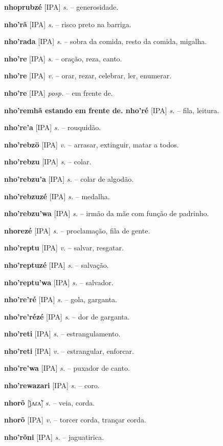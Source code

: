 \textbf{nhoprubzé} [IPA] \textit{s.} -- generosidade.

\textbf{nho'rã} [IPA] \textit{s.} -- risco preto na barriga.

\textbf{nho'rada} [IPA] \textit{s.} -- sobra da comida, resto da comida, migalha.

\textbf{nho're} [IPA] \textit{s.} -- oração, reza, canto.

\textbf{nho're} [IPA] \textit{v.} -- orar, rezar, celebrar, ler, enumerar.

\textbf{nho're} [IPA] \textit{posp.} -- em frente de.

\textbf{nho'remhã estando em frente de. nho'ré} [IPA] \textit{s.} -- fila, leitura.

\textbf{nho're'a} [IPA] \textit{s.} -- rouquidão.

\textbf{nho'rebzö} [IPA] \textit{v.} -- arrasar, extinguir, matar a todos.

\textbf{nho'rebzu} [IPA] \textit{s.} -- colar.

\textbf{nho'rebzu'a} [IPA] \textit{s.} -- colar de algodão.

\textbf{nho'rebzuzé} [IPA] \textit{s.} -- medalha.

\textbf{nho'rebzu'wa} [IPA] \textit{s.} -- irmão da mãe com função de padrinho.

\textbf{nhorezé} [IPA] \textit{s.} -- proclamação, fila de gente.

\textbf{nho'reptu} [IPA] \textit{v.} -- salvar, resgatar.

\textbf{nho'reptuzé} [IPA] \textit{s.} -- salvação.

\textbf{nho'reptu'wa} [IPA] \textit{s.} -- salvador.

\textbf{nho're'ré} [IPA] \textit{s.} -- gola, garganta.

\textbf{nho're'rézé} [IPA] \textit{s.} -- dor de garganta.

\textbf{nho'reti} [IPA] \textit{s.} -- estrangulamento.

\textbf{nho'reti} [IPA] \textit{v.} -- estrangular, enforcar.

\textbf{nho're'wa} [IPA] \textit{s.} -- puxador de canto.

\textbf{nho'rewazari} [IPA] \textit{s.} -- coro.

\textbf{nhorõ} [j̃ʌɾʌ̃] \textit{s.} -- veia, corda.

\textbf{nhorõ} [IPA] \textit{v.} -- torcer corda, trançar corda.

\textbf{nho'rõni} [IPA] \textit{s.} -- jaguatirica.

